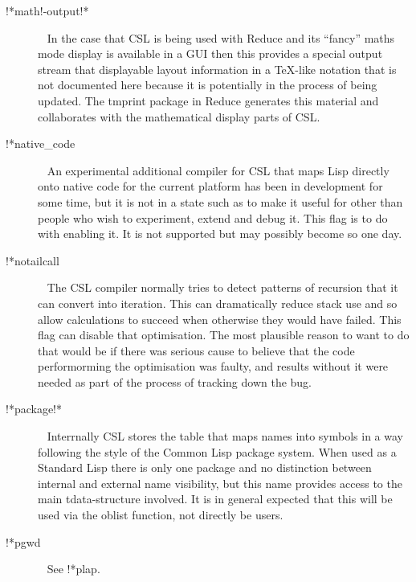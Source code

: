 \documentclass[a4paper,11pt]{article}
\begin{document}
\begin{description}
\item [{\ttfamily !*math!-output!*}]  ~\newline
In the case that CSL is being used with Reduce and its ``fancy'' maths mode
display is available in a GUI then this provides a special output
stream that displayable layout information in a {\TeX}-like notation that
is not documented here because it is potentially in the process of being
updated. The {\ttfamily tmprint} package in Reduce generates this
material and collaborates with the mathematical display parts of CSL.

\item [{\ttfamily !*native\_code}]  ~\newline
An experimental additional compiler for CSL that maps Lisp directly onto
native code for the current platform has been in development for some time,
but it is not in a state such as to make it useful for other than
people who wish to experiment, extend and debug it. This flag is to do
with enabling it. It is not supported but may possibly become so one day.

\item [{\ttfamily !*notailcall}]  ~\newline
The CSL compiler normally tries to detect patterns of recursion that it
can convert into iteration. This can dramatically reduce stack use and
so allow calculations to succeed when otherwise they would have failed.
This flag can disable that optimisation. The most plausible reason to
want to do that would be if there was serious cause to believe that the
code performorming the optimisation was faulty, and results without it were
needed as part of the process of tracking down the bug.

\item [{\ttfamily !*package!*}]  ~\newline
Interrnally CSL stores the table that maps names into symbols in a way
following the style of the Common Lisp package system. When used as
a Standard Lisp there is only one package and no distinction between
internal and external name visibility, but this name provides access to
the main tdata-structure involved. It is in general expected that this
will be used via the {\ttfamily oblist} function, not directly be users.

\item [{\ttfamily !*pgwd}]  ~\newline
See {\ttfamily !*plap}.


\end{description}
\end{document}
